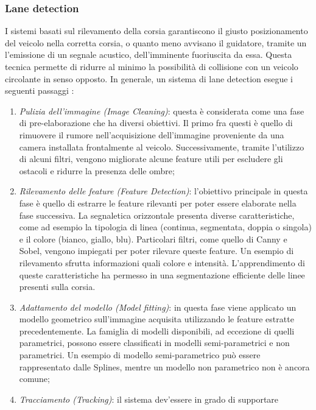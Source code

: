 \subsubsection{Lane detection}
I sistemi basati sul rilevamento della corsia garantiscono il giusto posizionamento 
del veicolo nella corretta corsia, o quanto meno avvisano il guidatore, 
tramite un l'emissione di un segnale acustico, dell'imminente fuoriuscita 
da essa. Questa tecnica permette di ridurre al minimo la possibilità di 
collisione con un veicolo circolante in senso opposto. In generale, un sistema 
di lane detection esegue i seguenti passaggi \cite{lane-steps}:
\begin{enumerate}
    \item \emph{Pulizia dell'immagine (Image Cleaning)}: questa è considerata come 
    una fase di pre-elaborazione che ha diversi obiettivi. Il primo fra 
    questi è quello di rimuovere il rumore nell'acquisizione dell'immagine 
    proveniente da una camera installata frontalmente al veicolo. Successivamente, 
    tramite l'utilizzo di alcuni filtri, vengono migliorate alcune 
    feature utili per escludere gli ostacoli e ridurre la presenza delle ombre;
    \item \emph{Rilevamento delle feature (Feature Detection)}: l'obiettivo principale 
    in questa fase è quello di estrarre le feature rilevanti per poter essere 
    elaborate nella fase successiva. La segnaletica orizzontale presenta 
    diverse caratteristiche, come ad esempio la tipologia di linea (continua, 
    segmentata, doppia o singola) e il colore (bianco, giallo, blu). Particolari 
    filtri, come quello di Canny e Sobel, vengono impiegati per poter 
    rilevare queste feature. Un esempio di rilevamento sfrutta informazioni 
    quali colore e intensità. L'apprendimento di queste caratteristiche ha 
    permesso in \cite{lane-detection} una segmentazione efficiente delle linee presenti sulla 
    corsia.
    \item \emph{Adattamento del modello (Model fitting)}: in questa fase viene applicato 
    un modello geometrico sull'immagine acquisita utilizzando le 
    feature estratte precedentemente. La famiglia di modelli disponibili, 
    ad eccezione di quelli parametrici, possono essere classificati in 
    modelli semi-parametrici e non parametrici. Un esempio di modello 
    semi-parametrico può essere rappresentato dalle Splines, mentre un 
    modello non parametrico non è ancora comune;
    \item \emph{Tracciamento (Tracking)}: il sistema dev'essere in grado di supportare 

\end{enumerate}
